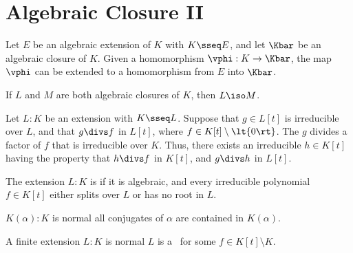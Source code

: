 \documentclass[a4paper]{article}
\begin{document}
\section{Algebraic Closure II}
\begin{ttheorem}
  Let $ E $ be an algebraic extension of $ K $ with $ K\sseq E $, and let $ \Kbar $ be an algebraic closure of $ K $.
  Given a homomorphism $ \vphi:K\to \Kbar $, the map $ \vphi $ can be extended to a homomorphism from $ E $ into $ \Kbar $.
\end{ttheorem}

\begin{ttheorem}
  If $L$ and $M$ are both algebraic closures of $K$, then $L \iso M$.
\end{ttheorem}

\begin{tcorollary}
  Let $ L:K $ be an extension with $ K\sseq L $.
  Suppose that $ g\in L[t] $ is irreducible over $ L $, and that $ g\divs f $ in $ L[t] $, where $ f\in K[t]\setminus \lt\{ 0 \rt\} $.
  The $ g $ divides a factor of $ f $ that is irreducible over $ K $.
  Thus, there exists an irreducible $ h\in K[t] $ having the property that $ h\divs f $ in $ K[t] $, and $ g\divs h $ in $ L[t] $.
\end{tcorollary}

\begin{tdefinition}
  The extension $ L:K $ is  if it is algebraic, and every irreducible polynomial $ f\in K[t] $ either splits over $ L $ or has no root in $ L $.
\end{tdefinition}

\begin{ttheorem}
  \( K(\alpha):K \) is normal \iff all conjugates of \( \alpha \) are contained in \( K(\alpha) \).
\end{ttheorem}

\begin{ttheorem}
  A finite extension \( L:K \) is normal \iff \( L \) is a \sfe~for some \( f\in K[t]\setminus K \).
\end{ttheorem}
\end{document}
